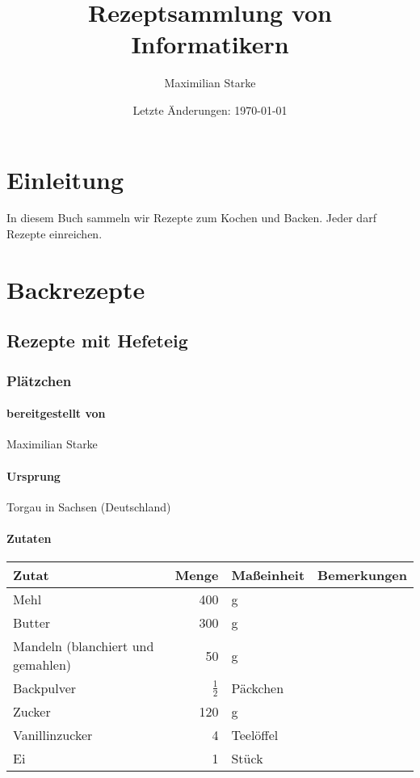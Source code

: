 \documentclass[a4paper]{book}
\title{Rezeptsammlung von Informatikern}
\date{Letzte Änderungen: \today}
\author{Maximilian Starke}
\begin{document}
\maketitle
\tableofcontents

\chapter*{Einleitung}

In diesem Buch sammeln wir Rezepte zum Kochen und Backen.
Jeder darf Rezepte einreichen. 

\chapter{Backrezepte}

\section{Rezepte mit Hefeteig}

\newpage
\subsection{Plätzchen}

\subsubsection{bereitgestellt von}
	Maximilian Starke
\subsubsection{Ursprung}
	Torgau in Sachsen (Deutschland)
\subsubsection{Zutaten}
\begin{center}
	\begin{tabular}{|l|rl|r|}
		\hline
		\textbf{Zutat} & \textbf{Menge} & \textbf{Maßeinheit} & \textbf{Bemerkungen}\\
		\hline
		Mehl & 400 & g & \\
		Butter & 300 & g & \\
		\hline
		Mandeln (blanchiert und gemahlen) & 50 & g & \\
		Backpulver & $\frac{1}{2}$ & Päckchen & \\
		\hline
		Zucker & 120 & g & \\
		Vanillinzucker & 4 & Teelöffel & \\
		\hline
		Ei & 1 &  Stück & \\
		\hline
	\end{tabular}
\end{center}
\end{document}
